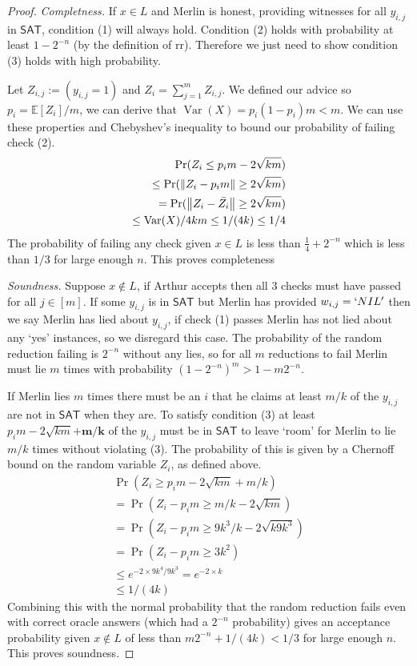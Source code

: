 \documentclass[10pt,a4paper]{article}
\newcommand{\norm}[1]{\left\lVert#1\right\rVert}
\begin{document}
\begin{proof}
    \textit{Completness.} If $x\in L$ and Merlin is honest, providing witnesses for all $y_{i,j}$ in $\mathsf{SAT}$, condition (1) will always hold. Condition (2) holds with probability at least $1-2^{-n}$ (by the definition of rr). Therefore we just need to show condition (3) holds with high probability.

    Let $Z_{i,j}:=(y_{i,j}=1)$ and $Z_{i}=\sum_{j=1}^m Z_{i,j}$. We defined our advice so $p_i= \mathbb{E}[Z_i]/m$, we can derive that $\operatorname{Var}(X)=p_i(1-p_i)m<m$. We can use these properties and Chebyshev's inequality to bound our probability of failing check (2).
    \begin{align*}
        \Pr(Z_i\leq p_im-2\sqrt{km})\\
        \leq\Pr(\norm{Z_i-p_im}\geq 2\sqrt{km})\\
        =\Pr(\norm{Z_i-\Bar{Z_i}}\geq 2\sqrt{km})\\
        \leq \operatorname{Var}(X)/4km\leq 1/(4k)\leq1/4
    \end{align*}
    The probability of failing any check given $x\in L$ is less than $\frac{1}{4}+2^{-n}$ which is less than $1/3$ for large enough $n$. This proves completeness

    \textit{Soundness.} Suppose $x \notin L$, if Arthur accepts then all 3 checks must have passed for all $j\in[m]$. If some $y_{i,j}$ is in $\mathsf{SAT}$ but Merlin has provided $w_{i,j}=`NIL'$ then we say Merlin has lied about $y_{i,j}$, if check (1) passes Merlin has not lied about any `yes' instances, so we disregard this case.
    The probability of the random reduction failing is $2^{-n}$ without any lies, so for all $m$ reductions to fail Merlin must lie $m$ times with probability $(1-2^{-n})^m> 1-m2^{-n}$.

    If Merlin lies $m$ times there must be an $i$ that he claims at least $m/k$ of the $y_{i,j}$ are not in $\mathsf{SAT}$ when they are. To satisfy condition (3) at least $p_im-2\sqrt{km}\mathbf{+m/k}$ of the $y_{i,j}$ must be in $\mathsf{SAT}$ to leave `room' for Merlin to lie $m/k$ times without violating (3). The probability of this is given by a Chernoff bound on the random variable $Z_i$, as defined above.
    \begin{align*}
    \Pr\left(Z_i\geq p_im-2\sqrt{km}+m/k\right)\\
    =\Pr\left(Z_i-p_im\geq m/k-2\sqrt{km}\right)\\
    =\Pr\left(Z_i-p_im\geq 9k^3/k-2\sqrt{k9k^3}\right)\\
    =\Pr\left(Z_i-p_im\geq 3k^2\right)\\
    \leq e^{-2\times 9k^4/9k^3}=e^{-2\times k}\\
    \leq 1/(4k)
    \end{align*}
    Combining this with the normal probability that the random reduction fails even with correct oracle answers (which had a $2^{-n}$ probability) gives an acceptance probability given $x\notin L$ of less than $m2^{-n}+1/(4k)<1/3$ for large enough $n$. This proves soundness.
    

\end{proof}
\end{document}
